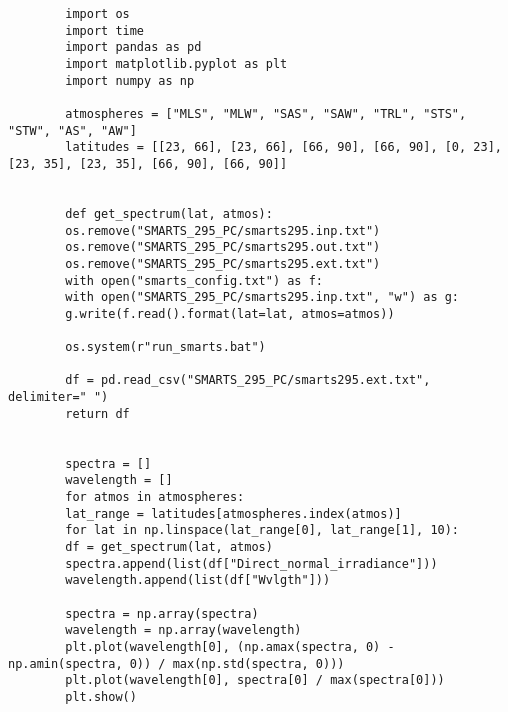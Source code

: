 \documentclass{article}
\begin{document}
    \begin{verbatim}
        import os
        import time
        import pandas as pd
        import matplotlib.pyplot as plt
        import numpy as np

        atmospheres = ["MLS", "MLW", "SAS", "SAW", "TRL", "STS", "STW", "AS", "AW"]
        latitudes = [[23, 66], [23, 66], [66, 90], [66, 90], [0, 23], [23, 35], [23, 35], [66, 90], [66, 90]]


        def get_spectrum(lat, atmos):
        os.remove("SMARTS_295_PC/smarts295.inp.txt")
        os.remove("SMARTS_295_PC/smarts295.out.txt")
        os.remove("SMARTS_295_PC/smarts295.ext.txt")
        with open("smarts_config.txt") as f:
        with open("SMARTS_295_PC/smarts295.inp.txt", "w") as g:
        g.write(f.read().format(lat=lat, atmos=atmos))

        os.system(r"run_smarts.bat")

        df = pd.read_csv("SMARTS_295_PC/smarts295.ext.txt", delimiter=" ")
        return df


        spectra = []
        wavelength = []
        for atmos in atmospheres:
        lat_range = latitudes[atmospheres.index(atmos)]
        for lat in np.linspace(lat_range[0], lat_range[1], 10):
        df = get_spectrum(lat, atmos)
        spectra.append(list(df["Direct_normal_irradiance"]))
        wavelength.append(list(df["Wvlgth"]))

        spectra = np.array(spectra)
        wavelength = np.array(wavelength)
        plt.plot(wavelength[0], (np.amax(spectra, 0) - np.amin(spectra, 0)) / max(np.std(spectra, 0)))
        plt.plot(wavelength[0], spectra[0] / max(spectra[0]))
        plt.show()

    \end{verbatim}
\end{document}
